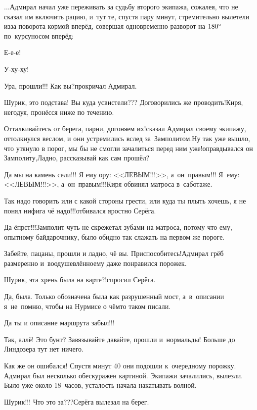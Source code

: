 $\ldots$Адмирал начал уже переживать за судьбу второго экипажа, сожалея, что не сказал им включить рацию, и~тут те, спустя пару минут, стремительно вылетели из\sdash за поворота кормой вперёд, совершая одновременно разворот на $180\degree$ по~курсу\mdash носом вперёд:

\diagdash Е-е-е!

\diagdash У-ху-ху!

\diagdash Ура, прошли!!! Как вы?\mdash прокричал Адмирал.

\diagdash Шурик, это подстава! Вы куда усвистели??? Договорились же проводить!\mdash Киря, негодуя, пронёсся ниже по течению.

\diagdash Отталкивайтесь от берега, парни, догоняем их!\mdash сказал Адмирал своему экипажу, оттолкнулся веслом, и они устремились вслед за~Замполитом.\mdash Ну так уже вышло, что утянуло в порог, мы бы не смогли зачалиться перед ним уже!\mdash оправдывался он Замполиту,\mdash Ладно, рассказывай как сам прошёл?

\diagdash Да мы на камень сели!!! Я ему ору: <<ЛЕВЫМ!!!>>, а~он~правым!!! Я~ему: <<ЛЕВЫМ!!!>>, а~он~правым!!!\mdash Киря обвинял матроса в~саботаже.

\diagdash Так надо говорить или с какой стороны грести, или куда ты плыть хочешь, я не понял нифига чё надо!!!\mdash отбивался яростно Серёга.

\diagdash Да ёпрст!!!\mdash Замполит чуть не скрежетал зубами на матроса, потому что ему, опытному байдарочнику, было обидно так слажать на первом же пороге.

\diagdash Забейте, пацаны, прошли и ладно, чё вы. Приспособитесь!\mdash Адмирал грёб размеренно и~воодушевлённо\mdash ему даже понравился порожек.

\diagdash Шурик, эта хрень была на карте?!\mdash спросил Серёга.

\diagdash Да, была. Только обозначена была как разрушенный мост, а~в~описании я~не~помню, чтобы на Нурмисе о чём\sdash то таком писали.

\diagdash Да ты и описание маршрута забыл!!!

\diagdash Так, аллё! Это бунт? Завязывайте давайте, прошли и~нормальды! Больше до Линдозера тут нет ничего.

Как же он ошибался! Спустя минут 40 они подошли к~очередному порожку. Адмирал был несколько обескуражен картиной. Экипажи зачалились, вылезли. Было уже около 18~часов, усталость начала накатывать волной.

\diagdash Шурик!!! Что это за???\mdash Серёга вылезал на берег.

